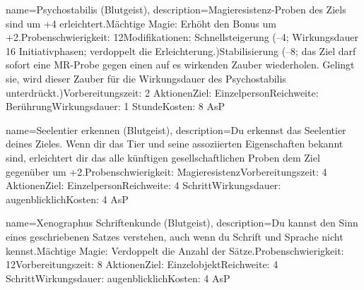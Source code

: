 {
    name={Psychostabilis (Blutgeist)},
    description={Magieresistenz-Proben des Ziels sind um +4 erleichtert.\newline Mächtige Magie: Erhöht den Bonus um +2.\newline Probenschwierigkeit: 12\newline Modifikationen: Schnellsteigerung (–4; Wirkungsdauer 16 Initiativphasen; verdoppelt die Erleichterung.)\newline Stabilisierung (–8; das Ziel darf sofort eine MR-Probe gegen einen auf es wirkenden Zauber wiederholen. Gelingt sie, wird dieser Zauber für die Wirkungsdauer des Psychostabilis unterdrückt.)\newline Vorbereitungszeit: 2 Aktionen\newline Ziel: Einzelperson\newline Reichweite: Berührung\newline Wirkungsdauer: 1 Stunde\newline Kosten: 8 AsP}
}


{
    name={Seelentier erkennen (Blutgeist)},
    description={Du erkennst das Seelentier deines Zieles. Wenn dir das Tier und seine assoziierten Eigenschaften bekannt sind, erleichtert dir das alle künftigen gesellschaftlichen Proben dem Ziel gegenüber um +2.\newline Probenschwierigkeit: Magieresistenz\newline Vorbereitungszeit: 4 Aktionen\newline Ziel: Einzelperson\newline Reichweite: 4 Schritt\newline Wirkungsdauer: augenblicklich\newline Kosten: 4 AsP}
}


{
    name={Xenographus Schriftenkunde (Blutgeist)},
    description={Du kannst den Sinn eines geschriebenen Satzes verstehen, auch wenn du Schrift und Sprache nicht kennst.\newline Mächtige Magie: Verdoppelt die Anzahl der Sätze.\newline Probenschwierigkeit: 12\newline Vorbereitungszeit: 8 Aktionen\newline Ziel: Einzelobjekt\newline Reichweite: 4 Schritt\newline Wirkungsdauer: augenblicklich\newline Kosten: 4 AsP}
}


